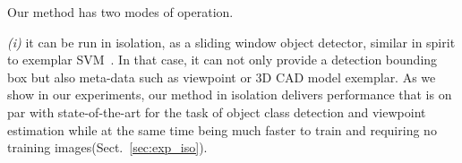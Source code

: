 % 
% 
% 
% 
% 
% 


Our method has two modes of operation.

{\em (i)} it can be run in isolation, as a sliding window object
detector, similar in spirit to exemplar SVM~\cite{Malisiewicz11}. In
that case, it can not only provide a detection bounding box but also
meta-data such as viewpoint or 3D CAD model exemplar.
As we show in our experiments, our method in isolation delivers
performance that is on par with state-of-the-art for the task of
object class detection and viewpoint estimation while at the same time
being much faster to train and requiring no training images(Sect.~\ref{sec:exp_iso}).

